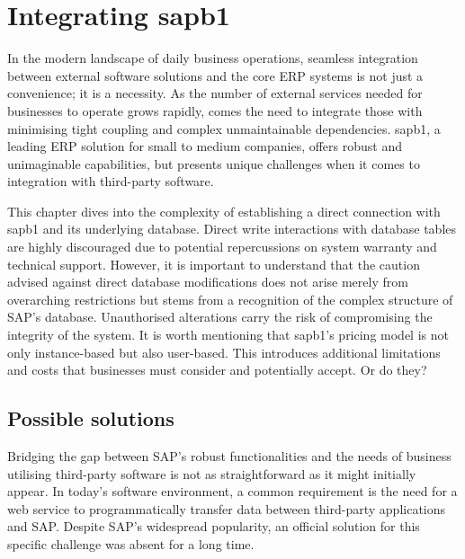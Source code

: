 \chapter{Integrating \gls{sapb1}}
\label{chap:integrating-sap-b1}

In the modern landscape of daily business operations, seamless integration between external software solutions and the core \ac{ERP} systems is not just a convenience; it is a necessity.
As the number of external services needed for businesses to operate grows rapidly, comes the need to integrate those with minimising tight coupling and complex unmaintainable dependencies.
\gls{sapb1}, a leading \ac{ERP} solution for small to medium companies, offers robust and unimaginable capabilities, but presents unique challenges when it comes to integration with third-party software. 

This chapter dives into the complexity of establishing a direct connection with \gls{sapb1} and its underlying database. 
Direct write interactions with database tables are highly discouraged due to potential repercussions on system warranty and technical support.
However, it is important to understand that the caution advised against direct database modifications does not arise merely from overarching restrictions but stems from a recognition of the complex structure of SAP's database. Unauthorised alterations carry the risk of compromising the integrity of the system.
It is worth mentioning that \gls{sapb1}'s pricing model is not only instance-based but also user-based.
This introduces additional limitations and costs that businesses must consider and potentially accept. 
Or do they?

\section{Possible solutions}
\label{sec:possible-solutions}

Bridging the gap between SAP's robust functionalities and the needs of business utilising third-party software is not as straightforward as it might initially appear. 
In today's software environment, a common requirement is the need for a web service to programmatically transfer data between third-party applications and SAP.
Despite SAP's widespread popularity, an official solution for this specific challenge was absent for a long time.

